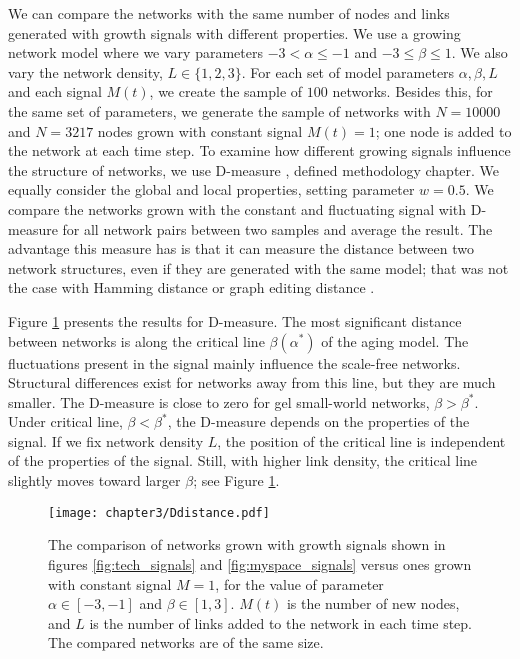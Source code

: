 We can compare the networks with the same number of nodes and links generated with growth signals with different properties. We use a growing network model where we vary parameters $-3<\alpha\leq-1$ and $-3\leq\beta\leq1$. We also vary the network density, $L\in\{1,2,3\}$. For each set of model parameters $\alpha, \beta, L$ and each signal $M(t)$, we create the sample of $100$ networks. Besides this, for the same set of parameters, we generate the sample of networks with $N=10000$ and $N=3217$ nodes grown with constant signal $M(t)=1$; one node is added to the network at each time step. To examine how different growing signals influence the structure of networks, we use D-measure \cite{tiago2}, defined methodology chapter. We equally consider the global and local properties, setting parameter $w=0.5$. We compare the networks grown with the constant and fluctuating signal with D-measure for all network pairs between two samples and average the result. The advantage this measure has is that it can measure the distance between two network structures, even if they are generated with the same model; that was not the case with Hamming distance or graph editing distance \cite{tiago2}.

Figure \ref{fig:dmeasure} presents the results for D-measure. The most significant distance between networks is along the critical line $\beta(\alpha^{*})$ of the aging model. The fluctuations present in the signal mainly influence the scale-free networks. Structural differences exist for networks away from this line, but they are much smaller. The D-measure is close to zero for gel small-world networks, $\beta>\beta^{*}$. Under critical line, $\beta<\beta^{*}$, the D-measure depends on the properties of the signal. If we fix network density $L$, the position of the critical line is independent of the properties of the signal. Still, with higher link density, the critical line slightly moves toward larger $\beta$; see Figure \ref{fig:dmeasure}.

\begin{figure}[ht]
	\centering
	\texttt{[image: chapter3/Ddistance.pdf]}
	\caption[D-measure for networks generated with real signals.]{The comparison of networks grown with growth signals shown in figures \ref{fig:tech_signals} and \ref{fig:myspace_signals} versus ones grown with constant signal $M=1$, for the value of parameter $\alpha\in[-3,-1]$ and $\beta\in[1,3]$. $M(t)$ is the number of new nodes, and $L$ is the number of links added to the network in each time step. The compared networks are of the same size.}
	\label{fig:dmeasure}
\end{figure}

